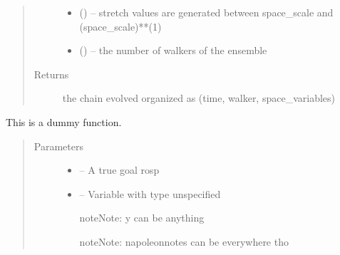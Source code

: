 \documentclass[letterpaper,10pt,english]{sphinxmanual}
\begin{document}
\begin{description}
\begin{fulllineitems}
\begin{quote}
\begin{description}
\begin{itemize}
\item {} 
 () – stretch values are generated between space\_scale and (space\_scale)**(\sphinxhyphen{}1)

\item {} 
 () – the number of walkers of the ensemble

\end{itemize}

\item[{Returns}] \leavevmode
the chain evolved organized as (time, walker, space\_variables)

\end{description}\end{quote}

\end{fulllineitems}


\begin{fulllineitems}
\label{\detokenize{autogen:AIE_sampling.dummyfunc}}
This is a dummy function.
\begin{quote}\begin{description}
\item[{Parameters}] \leavevmode\begin{itemize}
\item {} 
 – 
A true goal rosp

\item {} 
 – 
Variable with type unspecified

\begin{sphinxadmonition}{note}{Note:}
y can be anything
\end{sphinxadmonition}

\begin{sphinxadmonition}{note}{Note:}
napoleon\sphinxhyphen{}notes can be everywhere tho
\end{sphinxadmonition}


\end{itemize}


\end{description}
\end{quote}
\end{fulllineitems}
\end{description}
\end{document}
